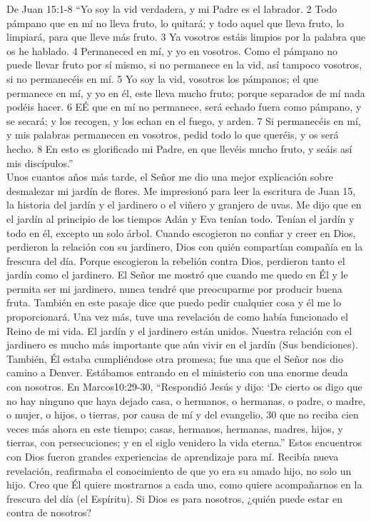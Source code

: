 \documentclass[twoside, 12pt]{book}
\begin{document}
De Juan 15:1-8 “Yo soy la vid verdadera, y mi Padre es el labrador. 2 Todo pámpano que en mí no lleva fruto, lo quitará; y todo aquel que lleva fruto, lo limpiará, para que lleve más fruto. 3 Ya vosotros estáis limpios por la palabra que os he hablado. 4 Permaneced en mí, y yo en vosotros. Como el pámpano no puede llevar fruto por sí mismo, si no permanece en la vid, así tampoco vosotros, si no permanecéis en mí. 5 Yo soy la vid, vosotros los pámpanos; el que permanece en mí, y yo en él, este lleva mucho fruto; porque separados de mí nada podéis hacer. 6 EÉ que en mí no permanece, será echado fuera como pámpano, y se secará; y los recogen, y los echan en el fuego, y arden. 7 Si permanecéis en mí, y mis palabras permanecen en vosotros, pedid todo lo que queréis, y os será hecho. 8 En esto es glorificado mi Padre, en que llevéis mucho fruto, y seáis así mis discípulos.”\\

Unos cuantos años más tarde, el Señor me dio una mejor explicación sobre desmalezar mi jardín de flores. Me impresionó para leer la escritura de Juan 15, la historia del jardín y el jardinero o el viñero y granjero de uvas. Me dijo que en el jardín al principio de los tiempos Adán y Eva tenían todo. Tenían el jardín y todo en él, excepto un solo árbol. Cuando escogieron no confiar y creer en Dios, perdieron la relación con su jardinero, Dios con quién compartían compañía en la frescura del día. Porque escogieron la rebelión contra Dios, perdieron tanto el jardín como el jardinero. El Señor me mostró que cuando me quedo en Él y le permita ser mi jardinero, nunca tendré que preocuparme por producir buena fruta. También en este pasaje dice que puedo pedir cualquier cosa y él me lo proporcionará.  Una vez más, tuve una revelación de como había funcionado el Reino de mi vida.  El jardín y el jardinero están unidos.  Nuestra relación con el jardinero es mucho más importante que aún vivir en el jardín (Sus bendiciones).\\

También, Él estaba cumpliéndose otra promesa; fue una que el Señor nos dio camino a Denver.  Estábamos entrando en el ministerio con una enorme deuda con nosotros.  En Marcos10:29-30, “Respondió Jesús y dijo: ‘De cierto os digo que no hay ninguno que haya dejado casa, o hermanos, o hermanas, o padre, o madre, o mujer, o hijos, o tierras, por causa de mí y del evangelio, 30 que no reciba cien veces más ahora en este tiempo; casas, hermanos, hermanas, madres, hijos, y tierras, con persecuciones; y en el siglo venidero la vida eterna.”
Estos encuentros con Dios fueron grandes experiencias de aprendizaje para mí.  Recibía nueva revelación, reafirmaba el conocimiento de que yo era su amado hijo, no solo un hijo.  Creo que Él quiere mostrarnos a cada uno, como quiere acompañarnos en la frescura del día (el Espíritu).
Si Dios es para nosotros, ¿quién puede estar en contra de nosotros?\\
\end{document}
